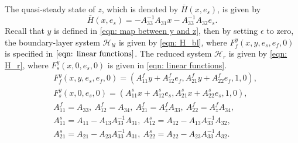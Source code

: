The quasi-steady state of $z$, which is denoted by $\overline{H}(x,e_s)$, is given by
\begin{equation}
    \overline{H}(x,e_s) = - A_{33}^{-1} A_{31} x - A_{33}^{-1} A_{32} e_s.
    \label{eqn: H bar linear}
\end{equation}
Recall that $y$ is defined in \eqref{eqn: map between y and z}, then by setting $\epsilon$ to zero, the boundary-layer system $\mathcal{H}_{bl}$ is given by \eqref{eqn: H_bl}, where $F_f^y(x,y,e_s,e_f,0)$ is specified in $\eqref{eqn: linear functions}$. The reduced system $\mathcal{H}_{r}$ is given by \eqref{eqn: H_r}, where $F_s^y(x,0,e_s, 0)$ is given in \eqref{eqn: linear functions}.
\begin{equation}
    \begin{aligned}
        &F_f^y(x,y,e_s,e_f,0) = (A_{11}^f y + A_{12}^f e_f, A_{21}^f y + A_{22}^f e_f, 1, 0), \\
        &F_s^y(x,0,e_s, 0) = (A_{11}^s x + A_{12}^s e_s, A_{21}^s x + A_{22}^s e_s, 1, 0), \\
        &A_{11}^f = A_{33}, \ A_{12}^f = A_{34},\ A_{21}^f = A_z^f A_{33},\ A_{22}^f = A_z^f A_{34}, \\
        &A_{11}^s = A_{11} - A_{13}A_{33}^{-1}A_{31},\ A_{12}^s = A_{12} - A_{13}A_{33}^{-1}A_{32}, \\
        &A_{21}^s = A_{21} - A_{23}A_{33}^{-1}A_{31},\ A_{22}^s = A_{22} - A_{23}A_{33}^{-1}A_{32}.   
    \end{aligned}
    \label{eqn: linear functions}
\end{equation}
%




